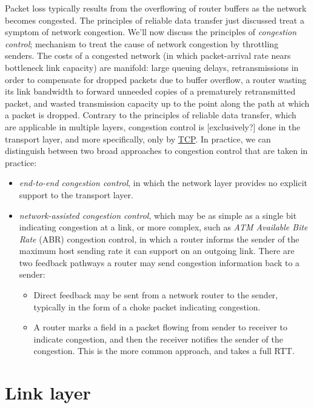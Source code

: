 \documentclass[8pt, table, xcdraw]{article}%
\begin{document}
Packet loss typically results from the overflowing of router buffers as the network becomes congested. The principles of reliable data transfer just discussed treat a symptom of network congestion. We'll now discuss the principles of \emph{congestion control}; mechanism to treat the cause of network congestion by throttling senders. The costs of a congested network (in which packet-arrival rate nears bottleneck link capacity) are manifold: large queuing delays, retransmissions in order to compensate for dropped packets due to buffer overflow, a router wasting its link bandwidth to forward unneeded copies of a prematurely retransmitted packet, and wasted transmission capacity up to the point along the path at which a packet is dropped. Contrary to the principles of reliable data transfer, which are applicable in multiple layers, congestion control is [exclusively?] done in the transport layer, and more specifically, only by \hyperref[ch:transport:tcp]{TCP}. In practice, we can distinguish between two broad approaches to congestion control that are taken in practice:

\begin{itemize}
    \item \emph{end-to-end congestion control}, in which the network layer provides no explicit support to the transport layer.
    \item \emph{network-assisted congestion control}, which may be as simple as a single bit indicating congestion at a link, or more complex, such as \emph{ATM Available Bite Rate} (ABR) congestion control, in which a router informs the sender of the maximum host sending rate it can support on an outgoing link. There are two feedback pathways a router may send congestion information back to a sender:
    \begin{itemize}
        \item Direct feedback may be sent from a network router to the sender, typically in the form of a choke packet indicating congestion.
        \item A router marks a field in a packet flowing from sender to receiver to indicate congestion, and then the receiver notifies the sender of the congestion. This is the more common approach, and takes a full RTT.
    \end{itemize}
\end{itemize}

\section{Link layer} \label{ch:link}
\end{document}
